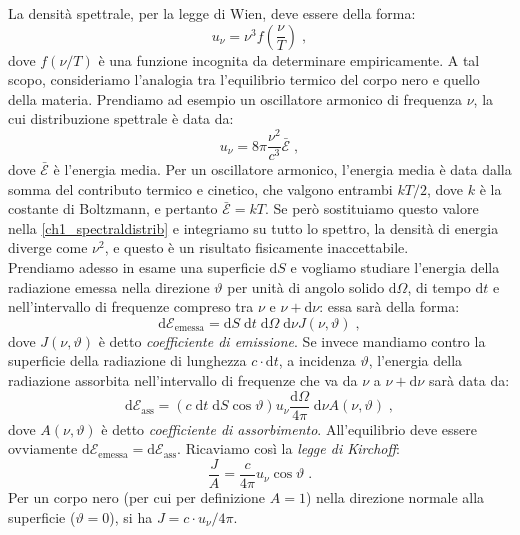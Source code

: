 \documentclass[12pt,a4paper]{report}
\theoremstyle{definition}
\numberwithin{equation}{section}
\newcommand{\diff}[1][]{\mathrm{d}#1}
\begin{document}
La densità spettrale, per la legge di Wien, deve essere della forma:
$$
u_{\nu}=\nu^3 f\left(\frac{\nu}{T}\right)\;,
$$
dove $f(\nu/T)$ è una funzione incognita da determinare empiricamente. A tal scopo, consideriamo l'analogia tra l'equilibrio termico del corpo nero e quello della materia. Prendiamo ad esempio un oscillatore armonico di frequenza $\nu$, la cui distribuzione spettrale è data da:
\begin{equation}
u_{\nu}=8\pi\frac{\nu^2}{c^3}\bar{\mathcal{E}}\;, \label{ch1_spectraldistrib}
\end{equation}
dove $\bar{\mathcal{E}}$ è l'energia media. Per un oscillatore armonico, l'energia media è data dalla somma del contributo termico e cinetico, che valgono entrambi $kT/2$, dove $k$ è la costante di Boltzmann, e pertanto $\bar{\mathcal{E}}=kT$. Se però sostituiamo questo valore nella \eqref{ch1_spectraldistrib} e integriamo su tutto lo spettro, la densità di energia diverge come $\nu^2$, e questo è un risultato fisicamente inaccettabile. \\
Prendiamo adesso in esame una superficie $\diff{S}$ e vogliamo studiare l'energia della radiazione emessa nella direzione $\vartheta$ per unità di angolo solido $\diff{\Omega}$, di tempo $\diff{t}$ e nell'intervallo di frequenze compreso tra $\nu$ e $\nu+\diff{\nu}$: essa sarà della forma:
\begin{equation}
\diff{\mathcal{E}_{\mathrm{emessa}}}=\diff{S}\;\diff{t}\;\diff{\Omega}\;\diff{\nu}J(\nu,\vartheta)\;,
\end{equation}
dove $J(\nu,\vartheta)$ è detto \textit{coefficiente di emissione}. Se invece mandiamo contro la superficie della radiazione di lunghezza $c\cdot \diff{t}$, a incidenza $\vartheta$, l'energia della radiazione assorbita nell'intervallo di frequenze che va da $\nu$ a $\nu+\diff{\nu}$ sarà data da:
\begin{equation}
\diff{\mathcal{E}_{\mathrm{ass}}}=(c\;\diff{t}\;\diff{S}\cos\vartheta)u_{\nu}\frac{\diff{\Omega}}{4\pi}\;\diff{\nu}A(\nu,\vartheta)\;,
\end{equation}
dove $A(\nu,\vartheta)$ è detto \textit{coefficiente di assorbimento}. All'equilibrio deve essere ovviamente $\diff{\mathcal{E}_{\mathrm{emessa}}}=\diff{\mathcal{E}_{\mathrm{ass}}}$. Ricaviamo così la \textit{legge di Kirchoff}:
\begin{equation}
\frac{J}{A}=\frac{c}{4\pi}u_{\nu}\cos\vartheta\;. \label{ch1_kirchofflaw}
\end{equation}
Per un corpo nero (per cui per definizione $A=1$) nella direzione normale alla superficie ($\vartheta=0$), si ha $J=c\cdot u_{\nu}/4\pi$. \\
\end{document}
